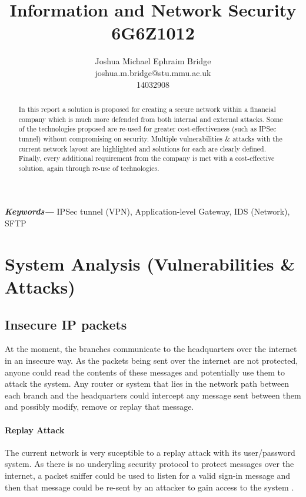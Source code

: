 \documentclass[11pt]{article}
\title{\vspace{2cm}\textbf{Information and Network Security}\\6G6Z1012}
\author{Joshua Michael Ephraim Bridge\\joshua.m.bridge@stu.mmu.ac.uk\\14032908}
\providecommand{\keywords}[1] {
  \small
  \textbf{\textit{Keywords---}} #1
}
\begin{document}
  \maketitle

  \vspace{1cm}

  \begin{abstract}
    In this report a solution is proposed for creating a secure network within a financial company which is much more defended from both internal and external attacks. Some of the technologies proposed are re-used for greater cost-effectiveness (such as IPSec tunnel) without compromising on security. Multiple vulnerabilities \& attacks with the current network layout are highlighted and solutions for each are clearly defined. Finally, every additional requirement from the company is met with a cost-effective solution, again through re-use of technologies.
  \end{abstract}

  \vspace{0.5cm}

  \keywords{IPSec tunnel (VPN), Application-level Gateway, IDS (Network), SFTP}

  \newpage


  \section{System Analysis (Vulnerabilities \& Attacks)}
    \subsection{Insecure IP packets}
      At the moment, the branches communicate to the headquarters over the internet in an insecure way. As the packets being sent over the internet are not protected, anyone could read the contents of these messages and potentially use them to attack the system. Any router or system that lies in the network path between each branch and the headquarters could intercept any message sent between them and possibly modify, remove or replay that message.

      \paragraph{Replay Attack}
        The current network is very suceptible to a replay attack with its user/password system. As there is no underyling security protocol to protect messages over the internet, a packet sniffer could be used to listen for a valid sign-in message and then that message could be re-sent by an attacker to gain access to the system \citep{owaspReplayAttack}.
\end{document}
